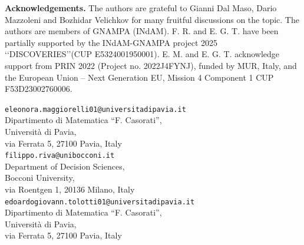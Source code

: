 \documentclass[a4paper,11pt,reqno]{amsart}
\numberwithin{equation}{section}
\theoremstyle{definition}
\theoremstyle{remark}
\begin{document}
	\bigskip
	
	\noindent\textbf{Acknowledgements.} The authors are grateful to Gianni Dal Maso, Dario Mazzoleni and Bozhidar Velichkov for many fruitful discussions on the topic. The authors are members of GNAMPA (INdAM). F. R. and E. G. T. have been partially supported by the INdAM-GNAMPA project 2025 \lq\lq DISCOVERIES\rq\rq (CUP E5324001950001). E. M. and E. G. T. acknowledge support from PRIN 2022 (Project no. 2022J4FYNJ), funded by MUR, Italy, and the European Union -- Next Generation EU, Mission 4 Component 1 CUP F53D23002760006.
	

	
	
	\bigskip
    \printbibliography
	
	
	\medskip
	\small
	\begin{flushleft}
		\noindent \verb"eleonora.maggiorelli01@universitadipavia.it"\\
		Dipartimento di Matematica  ``F. Casorati'', \\
		Universit\`a di Pavia,\\
		via Ferrata 5, 27100 Pavia, Italy\\
		\smallskip
		\noindent \verb"filippo.riva@unibocconi.it"\\
		Department of Decision Sciences, \\
		Bocconi University,\\
		via Roentgen 1, 20136 Milano, Italy\\
        \smallskip
        \noindent \verb"edoardogiovann.tolotti01@universitadipavia.it"\\
		Dipartimento di Matematica  ``F. Casorati'', \\
		Universit\`a di Pavia,\\
		via Ferrata 5, 27100 Pavia, Italy\\
	\end{flushleft}
\end{document}
